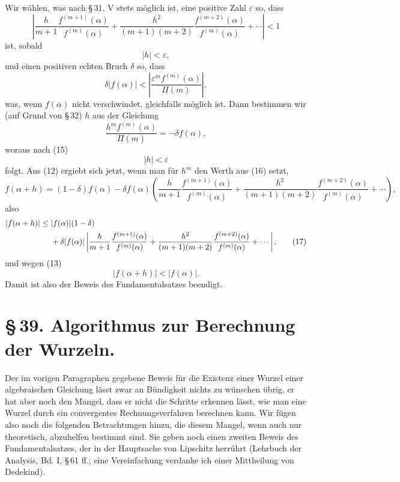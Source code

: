 \documentclass[11pt]{article}
\begin{document}
Wir wählen, was nach \S\,31, V stets möglich ist, eine positive Zahl $\varepsilon$ so, dass
\begin{equation}
\left|\frac{h}{m+1}\frac{f^{(m+1)}(\alpha)}{f^{(m)}(\alpha)}
+\frac{h^2}{(m+1)(m+2)}\frac{f^{(m+2)}(\alpha)}{f^{(m)}(\alpha)}+\cdots\right|<1
\tag{13}
\end{equation}
ist, sobald
\begin{equation}
 |h|<\varepsilon,
\tag{14}
\end{equation}
und einen positiven echten Bruch $\delta$ so, dass
\begin{equation}
 \delta |f(\alpha)|<\left|\frac{\varepsilon^m f^{(m)}(\alpha)}{\Pi(m)}\right|,
\tag{15}
\end{equation}
was, wenn $f(\alpha)$ nicht verschwindet, gleichfalls möglich ist. Dann bestimmen wir (auf Grund von \S\,32) $h$ aus der Gleichung
\begin{equation}
 \frac{h^m f^{(m)}(\alpha)}{\Pi(m)}=-\delta f(\alpha),
\tag{16}
\end{equation}
woraus nach (15)
\[
 |h|<\varepsilon
\]
folgt. Aus (12) ergiebt sich jetzt, wenn man für $h^m$ den Werth aus (16) setzt,
\[
 f(\alpha+h)=(1-\delta)f(\alpha)
 -\delta f(\alpha)\left(\frac{h}{m+1}\frac{f^{(m+1)}(\alpha)}{f^{(m)}(\alpha)}
 +\frac{h^2}{(m+1)(m+2)}\frac{f^{(m+2)}(\alpha)}{f^{(m)}(\alpha)}+\cdots\right),
\]
also
\begin{align}
 |f(\alpha+h)|\le{}& |f(\alpha)|(1-\delta)\notag\\
 &+\delta |f(\alpha)|\left|\frac{h}{m+1}\frac{f^{(m+1)}(\alpha)}{f^{(m)}(\alpha)}
 +\frac{h^2}{(m+1)(m+2)}\frac{f^{(m+2)}(\alpha)}{f^{(m)}(\alpha)}+\cdots\right|.
\tag{17}
\end{align}
und wegen (13)
\begin{equation}
 |f(\alpha+h)|<|f(\alpha)|.\tag{18}
\end{equation}
Damit ist also der Beweis des Fundamentalsatzes beendigt.


\section*{\S\,39. Algorithmus zur Berechnung der Wurzeln.}

Der im vorigen Paragraphen gegebene Beweis für die Existenz einer Wurzel einer algebraischen Gleichung lässt zwar an Bündigkeit nichts zu wünschen übrig, er hat aber noch den Mangel, dass er nicht die Schritte erkennen lässt, wie man eine Wurzel durch ein convergentes Rechnungsverfahren berechnen kann. Wir fügen also noch die folgenden Betrachtungen hinzu, die diesem Mangel, wenn auch nur theoretisch, abzuhelfen bestimmt sind. Sie geben noch einen zweiten Beweis des Fundamentalsatzes, der in der Hauptsache von Lipschitz herrührt (Lehrbuch der Analysis, Bd. I, \S\,61 ff.; eine Vereinfachung verdanke ich einer Mittheilung von Dedekind).
\end{document}
